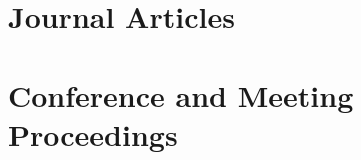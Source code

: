 \documentclass[letterpaper,12pt]{article}
\begin{document}
\newpage
\section{Journal Articles}
\begin{refsection}
\nocite{*}
\printbibliography[heading=none]
\end{refsection}

\section{Conference and Meeting Proceedings}
\begin{refsection}
\nocite{*}
\printbibliography[heading=none]
\end{refsection}

\vfill
{}
\end{document}
